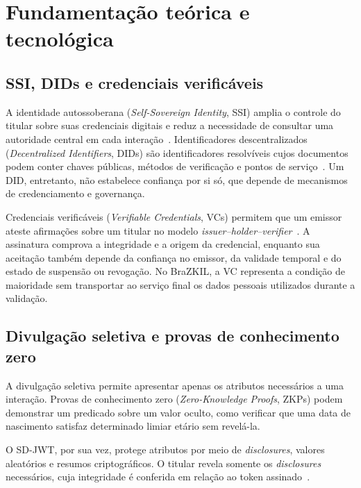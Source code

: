 \documentclass[12pt]{article}
\begin{document}
\section{Fundamentação teórica e tecnológica}
\label{sec:fundamentacao}

\subsection{SSI, DIDs e credenciais verificáveis}

A identidade autossoberana (\textit{Self-Sovereign Identity}, SSI) amplia o controle do titular sobre suas credenciais digitais e reduz a necessidade de consultar uma autoridade central em cada interação~\cite{kuhn2018inevitable}. Identificadores descentralizados (\textit{Decentralized Identifiers}, DIDs) são identificadores resolvíveis cujos documentos podem conter chaves públicas, métodos de verificação e pontos de serviço~\cite{w3cdid2022}. Um DID, entretanto, não estabelece confiança por si só, que depende de mecanismos de credenciamento e governança.

Credenciais verificáveis (\textit{Verifiable Credentials}, VCs) permitem que um emissor ateste afirmações sobre um titular no modelo \textit{issuer--holder--verifier}~\cite{w3cvc2025}. A assinatura comprova a integridade e a origem da credencial, enquanto sua aceitação também depende da confiança no emissor, da validade temporal e do estado de suspensão ou revogação. No BraZKIL, a VC representa a condição de maioridade sem transportar ao serviço final os dados pessoais utilizados durante a validação.

\subsection{Divulgação seletiva e provas de conhecimento zero}

A divulgação seletiva permite apresentar apenas os atributos necessários a uma interação. Provas de conhecimento zero (\textit{Zero-Knowledge Proofs}, ZKPs) podem demonstrar um predicado sobre um valor oculto, como verificar que uma data de nascimento satisfaz determinado limiar etário sem revelá-la.

O SD-JWT, por sua vez, protege atributos por meio de \textit{disclosures}, valores aleatórios e resumos criptográficos. O titular revela somente os \textit{disclosures} necessários, cuja integridade é conferida em relação ao token assinado~\cite{sdjwtvc2024}.
\end{document}
